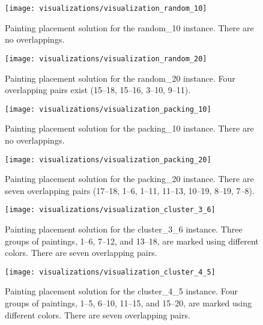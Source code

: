 \begin{figure}[h!]
    \texttt{[image: visualizations/visualization\_random\_10]}
    \caption[Painting placement solution for the random\_10 instance]
        {Painting placement solution for the random\_10 instance.
    There are no overlappings.}
    \label{fig:results:visualization-random-10}
\end{figure}

\begin{figure}[h!]
    \texttt{[image: visualizations/visualization\_random\_20]}
    \caption[Painting placement solution for the random\_20 instance]
        {Painting placement solution for the random\_20 instance.
    Four overlapping pairs exist (15–18, 15–16, 3–10, 9–11).}
    \label{fig:results:visualization-random-20}
\end{figure}

\begin{figure}[h!]
    \texttt{[image: visualizations/visualization\_packing\_10]}
    \caption[Painting placement solution for the packing\_10 instance]
        {Painting placement solution for the packing\_10 instance.
    There are no overlappings.}
    \label{fig:results:visualization-packing-10}
\end{figure}

\begin{figure}[h!]
    \texttt{[image: visualizations/visualization\_packing\_20]}
    \caption[Painting placement solution for the packing\_20 instance]
        {Painting placement solution for the packing\_20 instance.
    There are seven overlapping pairs (17–18, 1–6, 1–11, 11–13, 10–19, 8–19, 7–8).}
    \label{fig:results:visualization-packing-20}
\end{figure}

\begin{figure}[h!]
    \texttt{[image: visualizations/visualization\_cluster\_3\_6]}
    \caption[Painting placement solution for the cluster\_3\_6 instance]
        { Painting placement solution for the cluster\_3\_6 instance.
    Three groups of paintings, \numrange{1}{6}, \numrange{7}{12}, and \numrange{13}{18}, are marked using different colors.
    There are seven overlapping pairs.}
    \label{fig:results:visualization-cluster-3-6}
\end{figure}

\begin{figure}[h!]
    \texttt{[image: visualizations/visualization\_cluster\_4\_5]}
    \caption[Painting placement solution for the cluster\_4\_5 instance]
        { Painting placement solution for the cluster\_4\_5 instance.
    Four groups of paintings, \numrange{1}{5}, \numrange{6}{10}, \numrange{11}{15}, and \numrange{15}{20}, are marked using different colors.
    There are seven overlapping pairs.}
    \label{fig:results:visualization-cluster-4-5}
\end{figure}


